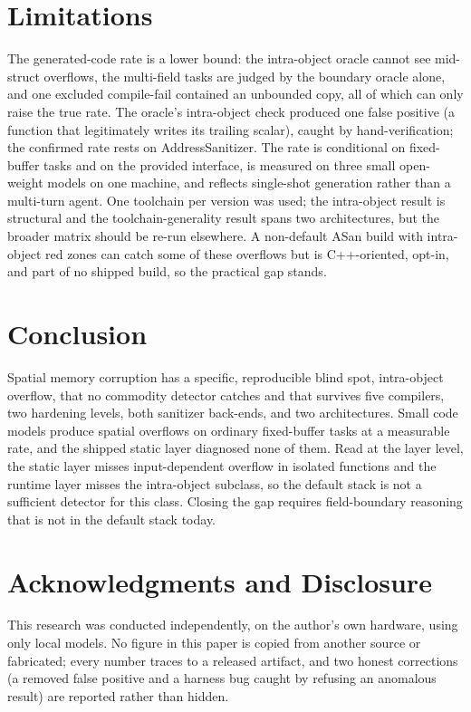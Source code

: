 \documentclass[11pt]{article}
\begin{document}
\section*{Limitations}
The generated-code rate is a lower bound: the intra-object oracle cannot see mid-struct overflows, the
multi-field tasks are judged by the boundary oracle alone, and one excluded compile-fail
contained an unbounded copy, all of which can only raise the true rate. The oracle's
intra-object check produced one false positive (a function that legitimately writes its
trailing scalar), caught by hand-verification; the confirmed rate rests on AddressSanitizer.
The rate is conditional on fixed-buffer tasks and on the provided interface, is measured on
three small open-weight models on one machine, and reflects single-shot generation rather than
a multi-turn agent. One toolchain per version was used; the intra-object result is structural
and the toolchain-generality result spans two architectures, but the broader matrix should be
re-run elsewhere. A non-default
ASan build with intra-object red zones can catch some of these overflows but is C++-oriented,
opt-in, and part of no shipped build, so the practical gap stands.

\section*{Conclusion}
Spatial memory corruption has a specific, reproducible blind spot, intra-object overflow, that
no commodity detector catches and that survives five compilers, two hardening levels, both
sanitizer back-ends, and two architectures. Small code models produce spatial overflows on
ordinary fixed-buffer tasks at a measurable rate, and the shipped static layer diagnosed none
of them. Read at the layer level, the static layer misses input-dependent overflow in isolated
functions and the runtime layer misses the intra-object subclass, so the default stack is not
a sufficient detector for this class. Closing the gap requires field-boundary reasoning that is
not in the default stack today.

\section*{Acknowledgments and Disclosure}
This research was conducted independently, on the author's own hardware, using only local
models. No figure in this paper is copied from another source or fabricated; every number
traces to a released artifact, and two honest corrections (a removed false positive and a
harness bug caught by refusing an anomalous result) are reported rather than hidden.
\end{document}
